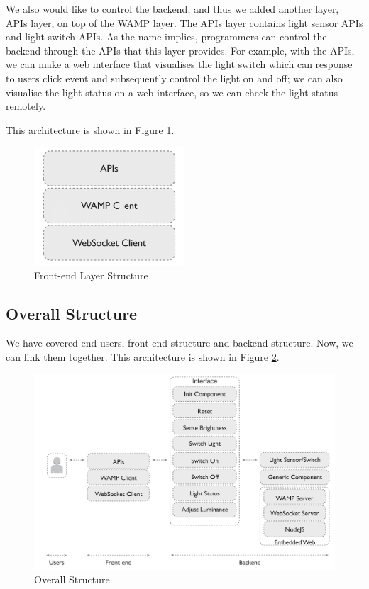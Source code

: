 We also would like to control the backend, and thus we added another layer, APIs layer, on top of the WAMP layer. The APIs layer contains light sensor APIs and light switch APIs. As the name implies, programmers can control the backend through the APIs that this layer provides. For example, with the APIs, we can make a web interface that visualises the light switch which can response to users click event and subsequently control the light on and off; we can also visualise the light status on a web interface, so we can check the light status remotely. 

This architecture is shown in Figure \ref{fig:front-end-layer-structure}.

\begin{figure}[t]
  \begin{center}
    \includegraphics[width=0.5\textwidth]{images/front-end-layer-structure.pdf}
    \caption{Front-end Layer Structure}
    \label{fig:front-end-layer-structure}
  \end{center}
\end{figure}

\subsection{Overall Structure}
We have covered end users, front-end structure and backend structure. Now, we can link them together. This architecture is shown in Figure \ref{fig:communication-structure-with-user}.

\begin{figure}[t]
  \begin{center}
    \includegraphics[width=1\textwidth]{images/communication-structure-with-user.pdf}
    \caption{Overall Structure}
    \label{fig:communication-structure-with-user}
  \end{center}
\end{figure}

